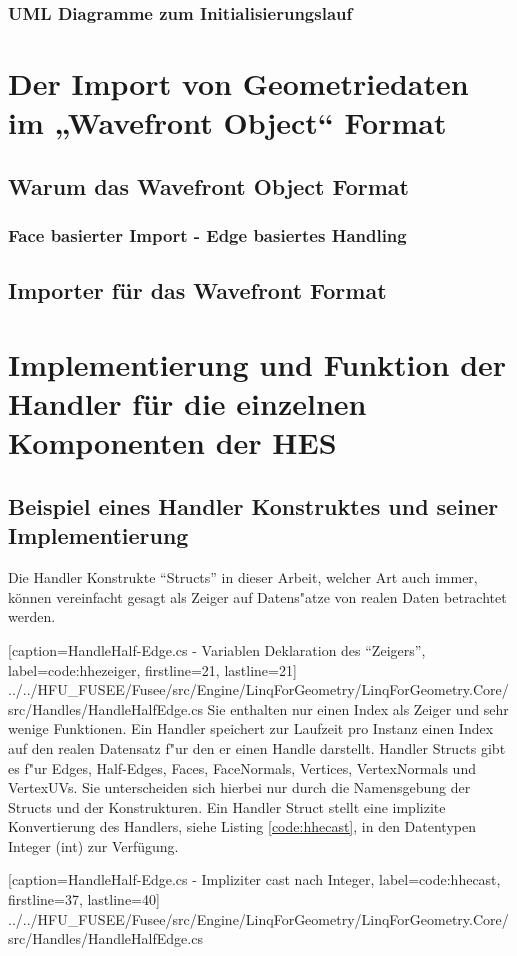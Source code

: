 \documentclass[12pt,a4paper]{scrreprt}
\begin{document}
			\subsubsection {UML Diagramme zum Initialisierungslauf}
	\section {Der Import von Geometriedaten im „Wavefront Object“ Format}
		\subsection {Warum das Wavefront Object Format}
			\subsubsection {Face basierter Import - Edge basiertes Handling}
		\subsection {Importer für das Wavefront Format}
	\section {Implementierung und Funktion der Handler für die einzelnen Komponenten der HES}
		\subsection {Beispiel eines Handler Konstruktes und seiner Implementierung}
Die Handler Konstrukte "`Structs"' in dieser Arbeit, welcher Art auch immer, können vereinfacht gesagt als Zeiger auf Datens"atze von realen Daten betrachtet werden.

			[caption={HandleHalf-Edge.cs - Variablen Deklaration des "`Zeigers"'}, label=code:hhezeiger, firstline=21, lastline=21]
			{../../HFU_FUSEE/Fusee/src/Engine/LinqForGeometry/LinqForGeometry.Core/src/Handles/HandleHalfEdge.cs}
Sie enthalten nur einen Index als Zeiger und sehr wenige Funktionen. Ein Handler speichert zur Laufzeit pro Instanz einen Index auf den realen Datensatz f"ur den er einen Handle darstellt. Handler Structs gibt es f"ur Edges, Half-Edges, Faces, FaceNormals, Vertices, VertexNormals und VertexUVs. Sie unterscheiden sich hierbei nur durch die Namensgebung der Structs und der Konstrukturen.
Ein Handler Struct stellt eine implizite Konvertierung des Handlers, siehe Listing \ref{code:hhecast}, in den Datentypen Integer (int) zur Verfügung.

			[caption={HandleHalf-Edge.cs - Impliziter cast nach Integer}, label=code:hhecast, firstline=37, lastline=40]
			{../../HFU_FUSEE/Fusee/src/Engine/LinqForGeometry/LinqForGeometry.Core/src/Handles/HandleHalfEdge.cs}
\end{document}

